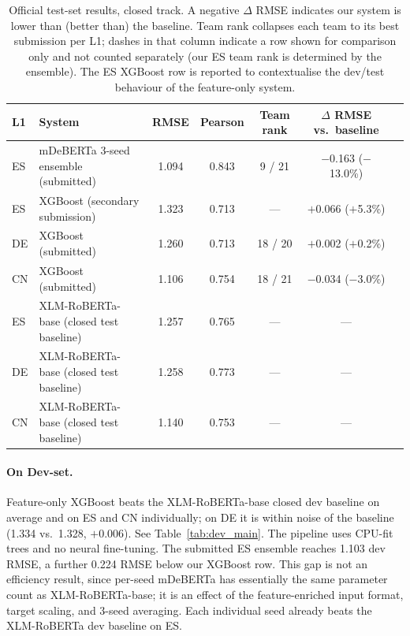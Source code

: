 \documentclass[11pt]{article}
\begin{document}
\begin{table}[t!]
\centering
\small
\begin{tabular}{llccccc}
\toprule
\textbf{L1} & \textbf{System} & \textbf{RMSE} & \textbf{Pearson} & \textbf{Team rank} & \textbf{$\Delta$ RMSE vs.\ baseline} \\
\midrule
ES & mDeBERTa 3-seed ensemble (submitted) & 1.094 & 0.843 & 9 / 21 & $-$0.163 ($-$13.0\%) \\
ES & XGBoost (secondary submission) & 1.323 & 0.713 & --- & $+$0.066 ($+$5.3\%) \\
DE & XGBoost (submitted) & 1.260 & 0.713 & 18 / 20 & $+$0.002 ($+$0.2\%) \\
CN & XGBoost (submitted) & 1.106 & 0.754 & 18 / 21 & $-$0.034 ($-$3.0\%) \\
\midrule
ES & XLM-RoBERTa-base (closed test baseline) & 1.257 & 0.765 & --- & --- \\
DE & XLM-RoBERTa-base (closed test baseline) & 1.258 & 0.773 & --- & --- \\
CN & XLM-RoBERTa-base (closed test baseline) & 1.140 & 0.753 & --- & --- \\
\bottomrule
\end{tabular}
\caption{Official test-set results, closed track. A negative $\Delta$ RMSE indicates our system is lower than (better than) the baseline. Team rank collapses each team to its best submission per L1; dashes in that column indicate a row shown for comparison only and not counted separately (our ES team rank is determined by the ensemble). The ES XGBoost row is reported to contextualise the dev/test behaviour of the feature-only system.}
\label{tab:test_main}
\end{table}

\paragraph{On Dev-set.} Feature-only XGBoost beats the XLM-RoBERTa-base closed dev baseline on average and on ES and CN individually; on DE it is within noise of the baseline (1.334 vs.\ 1.328, $+$0.006). See Table~\ref{tab:dev_main}. The pipeline uses CPU-fit trees and no neural fine-tuning. The submitted ES ensemble reaches 1.103 dev RMSE, a further 0.224 RMSE below our XGBoost row. This gap is not an efficiency result, since per-seed mDeBERTa has essentially the same parameter count as XLM-RoBERTa-base; it is an effect of the feature-enriched input format, target scaling, and 3-seed averaging. Each individual seed already beats the XLM-RoBERTa dev baseline on ES.
\end{document}
